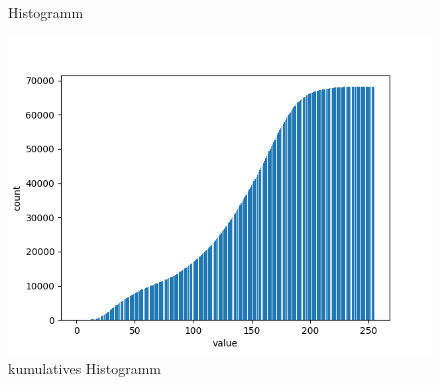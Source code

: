 \documentclass[12pt]{article}
\begin{document}
\begin{figure}[h]
\begin{minipage}{0.32\textwidth}
    Histogramm
  \end{minipage}
  \hfill
  \begin{minipage}{0.32\textwidth}
    \centering
    \includegraphics[width=\textwidth]{ausgangsbild_histogramm_kumulativ.png}
    kumulatives Histogramm
  \end{minipage}
\end{figure}
\end{document}
